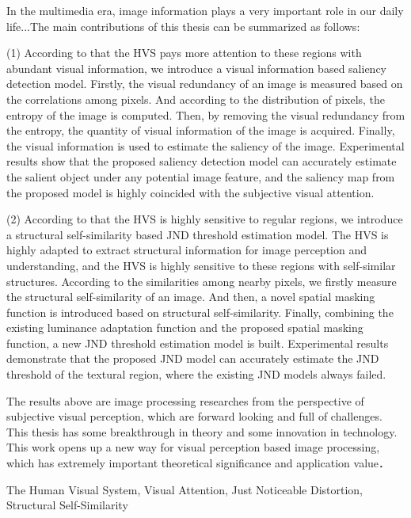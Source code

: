 \begin{eabstract}
In the multimedia era, image information plays a very important role in our daily life...The main contributions of this thesis can be summarized as follows:

(1) According to that the HVS pays more attention to these regions with abundant visual information, we introduce a visual information based saliency detection model. Firstly, the visual redundancy of an image is measured based on the correlations among pixels. And according to the distribution of pixels, the entropy of the image is computed. Then, by removing the visual redundancy from the entropy, the quantity of visual information of the image is acquired. Finally, the visual information is used to estimate the saliency of the image. Experimental results show that the proposed saliency detection model can accurately estimate the salient object under any potential image feature, and the saliency map from the proposed model is highly coincided with the subjective visual attention.


(2) According to that the HVS is highly sensitive to regular regions, we introduce a structural self-similarity based JND threshold estimation model. The HVS is highly adapted to extract structural information for image perception and understanding, and the HVS is highly sensitive to these regions with self-similar structures. According to the similarities among nearby pixels, we firstly measure the structural self-similarity of an image. And then, a novel spatial masking function is introduced based on structural self-similarity. Finally, combining the existing luminance adaptation function and the proposed spatial masking function, a new JND threshold estimation model is built. Experimental results demonstrate that the proposed JND model can accurately estimate the JND threshold of the textural region, where the existing JND models always failed.

The results above are image processing researches from the perspective of subjective visual perception, which are forward looking and full of challenges.  This thesis has some breakthrough in theory and some innovation in technology. This work opens up a new way for visual perception based image processing, which has extremely important theoretical significance and application value．


\end{eabstract}


\begin{ekeywords}
The Human Visual System, Visual Attention, Just Noticeable Distortion, Structural Self-Similarity
\end{ekeywords}



